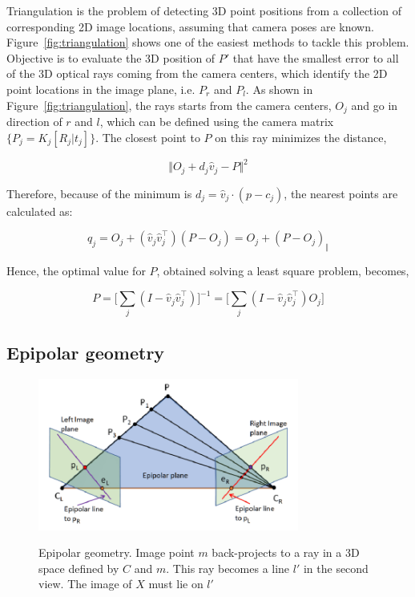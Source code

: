 Triangulation is the problem of detecting 3D point positions from a collection of corresponding 2D image locations, assuming that camera poses are known.
Figure~\ref{fig:triangulation} shows one of the easiest methods to tackle this problem. 
Objective is to evaluate the 3D position of $P'$ that have the smallest error to all of the 3D optical rays coming from the camera centers, which identify the 2D point locations in the image plane, i.e. $P_r$ and $P_l$.
As shown in Figure~\ref{fig:triangulation}, the rays starts from the camera centers, $O_j$ and go in direction of $r$ and $l$, which can be defined using the camera matrix $ \{ P_j = K_j [ R_j | t_j ] \} $.
The closest point to $P$ on this ray minimizes the distance,

\begin{equation}
\label{eqn:mindist}
	\Vert O_j + d_j \hat{v}_j - P \Vert^2
\end{equation}

Therefore, because of the minimum is $d_j = \hat{v}_j \cdot (p - c_j)$, the nearest points are calculated as:

\begin{equation}\label{eqn:closestpoint}
	q_j = O_j + (\hat{v}_j \hat{v}_j^\top)(P - O_j) = O_j + (P - O_j)_{\Vert}
\end{equation}

Hence, the optimal value for $P$, obtained solving a least square problem, becomes,

\begin{equation}\label{eqn:solP}
	P = \Big[ \sum_j (I - \hat{v}_j \hat{v}_j^\top ) \Big]^{-1} = \Big[ \sum_j (I - \hat{v}_j \hat{v}_j^\top )O_j \Big]
\end{equation}

\subsection{Epipolar geometry}
\label{subsection:epipolar-geometry}

\begin{figure}[t]
	\begin{center}
		{\includegraphics[width=.8\textwidth, height=5cm, keepaspectratio]{images/epipolar-geometry-2}}
\caption{Epipolar geometry. Image point $m$ back-projects to a ray in a 3D space defined by $C$ and $m$. This ray becomes a line $l'$ in the second view. The image of $X$ must lie on $l'$}
\label{fig:epipolargeom-2}
	\end{center}
\end{figure}

